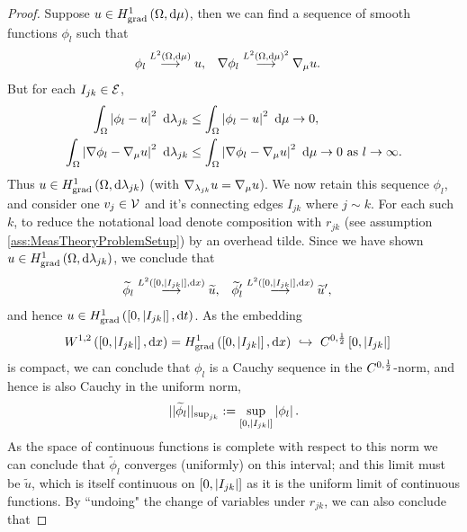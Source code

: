 \begin{proof}
	Suppose $u\in H^1_\mathrm{grad}\left( \Omega, \mathrm{d}\mu \right)$, then we can find a sequence of smooth functions $\phi_l$ such that
	\begin{align*}
		\phi_l \overset{L^{2}\left( \Omega,\mathrm{d}\mu \right)}{\longrightarrow} u, 
		&\quad \nabla\phi_l \overset{L^{2}\left( \Omega,\mathrm{d}\mu \right)^2}{\longrightarrow} \nabla_\mu u.
	\end{align*}
	But for each $I_{jk}\in \mathcal{E}$,
	\begin{align*}
		\int_{\Omega}\left\lvert  \phi_l - u  \right\rvert^2 \ \mathrm{d}\lambda_{jk}
		&\leq \int_{\Omega}\left\lvert  \phi_l - u  \right\rvert^2 \ \mathrm{d}\mu \rightarrow 0, \\
		\int_{\Omega}\left\lvert  \nabla\phi_l - \nabla_\mu u  \right\rvert^2 \ \mathrm{d}\lambda_{jk}
		&\leq \int_{\Omega}\left\lvert  \nabla\phi_l - \nabla_\mu u  \right\rvert^2 \ \mathrm{d}\mu \rightarrow 0 \ \text{as} \ l \rightarrow\infty.
	\end{align*}
	Thus $u\in H^1_\mathrm{grad}\left( \Omega, \mathrm{d}\lambda_{jk} \right)$ (with $\nabla_{\lambda_{jk}}u = \nabla_\mu u$).
	We now retain this sequence $\phi_l$, and consider one $v_j\in \mathcal{V}$ and it's connecting edges $I_{jk}$ where $j\sim k$.
	For each such $k$, to reduce the notational load denote composition with $r_{jk}$ (see assumption \ref{ass:MeasTheoryProblemSetup}) by an overhead tilde.
	Since we have shown $u\in H^1_\mathrm{grad}\left( \Omega, \mathrm{d}\lambda_{jk} \right)$, we conclude that 
	\begin{align*}
		\widetilde{\phi}_l \overset{L^{2}\left( \left[ 0,\left\lvert I_{jk} \right\rvert \right],\mathrm{d}x \right)}{\longrightarrow} \widetilde{u}, 
		&\quad \widetilde{\phi}'_l \overset{L^{2}\left( \left[ 0,\left\lvert I_{jk} \right\rvert \right],\mathrm{d}x \right)}{\longrightarrow} \widetilde{u}',
	\end{align*}
	and hence $u\in H^1_\mathrm{grad}\left( \left[ 0,\left\lvert I_{jk} \right\rvert \right], \mathrm{d}t \right)$.
	As the embedding 
	\begin{align*}
		W^{1,2}\bracs{\interval{I_{jk}}, \md x} = \gradSob{\interval{I_{jk}}}{x} \ &\hookrightarrow \ C^{0,\recip{2}}\interval{I_{jk}}
	\end{align*}
	is compact, we can conclude that $\phi_l$ is a Cauchy sequence in the $C^{0,\frac{1}{2}}$-norm, and hence is also Cauchy in the uniform norm,
	\begin{align*}
		\lvert\lvert \widetilde{\phi}_l \rvert\rvert_{\mathrm{sup}_{jk}} := \sup_{\left[ 0,\left\lvert I_{jk} \right\rvert \right]}\left\lvert \phi_l \right\rvert.
	\end{align*}
	As the space of continuous functions is complete with respect to this norm we can conclude that $\widetilde{\phi}_l$ converges (uniformly) on this interval; and this limit must be $\widetilde{u}$, which is itself continuous on $\left[ 0,\left\lvert I_{jk} \right\rvert \right]$ as it is the uniform limit of continuous functions.
	By ``undoing" the change of variables under $r_{jk}$, we can also conclude that

\end{proof}
